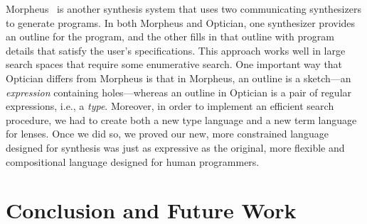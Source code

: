 \documentclass[acmsmall,review,anonymous]{acmart}\settopmatter{printfolios=true,printccs=false,printacmref=false}
\begin{document}
Morpheus~\cite{morpheus} is another synthesis system that uses two
communicating synthesizers to generate programs.  In both Morpheus and
Optician, one synthesizer provides an
outline for the program, and the other fills in that outline with program
details that satisfy the user's specifications.
This approach works well in large search spaces that require some enumerative
search.
One important way that Optician differs from Morpheus is that in
Morpheus, an outline is a sketch---an
\emph{expression}
containing holes---whereas
an outline in Optician is a pair of regular
expressions, i.e., a
\emph{type}.  Moreover, in order to implement an efficient
search procedure, we had to create both a new type language and a new
term language for lenses.  Once we did so, we proved our new, more
constrained language
designed for synthesis was just as expressive as the original, more
flexible and compositional language designed for human programmers.


\section{Conclusion and Future Work}
\label{concl}



\end{document}
